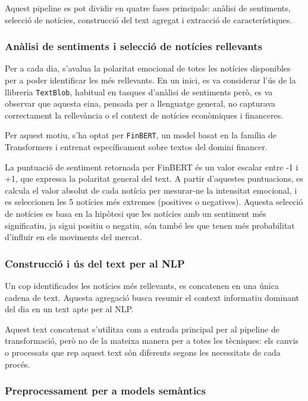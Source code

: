 \documentclass[12pt,a4paper,twoside]{book}
\begin{document}
Aquest pipeline es pot dividir en quatre fases principals: anàlisi de sentiments, selecció de notícies, construcció del text agregat i extracció de característiques.

\subsubsection{Anàlisi de sentiments i selecció de notícies rellevants}

Per a cada dia, s'avalua la polaritat emocional de totes les notícies disponibles per a poder identificar les més rellevants. En un inici, es va considerar l'ús de la llibreria \texttt{TextBlob}, habitual en tasques d'anàlisi de sentiments però, es va observar que aquesta eina, pensada per a llenguatge general, no capturava correctament la rellevància o el context de notícies econòmiques i financeres.

Per aquest motiu, s'ha optat per \texttt{FinBERT}, un model basat en la família de Transformers i entrenat específicament sobre textos del domini financer.

La puntuació de sentiment retornada per FinBERT és un valor escalar entre -1 i +1, que expressa la polaritat general del text. A partir d'aquestes puntuacions, es calcula el valor absolut de cada notícia per mesurar-ne la intensitat emocional, i es seleccionen les 5 notícies més extremes (positives o negatives). Aquesta selecció de notícies es basa en la hipòtesi que les notícies amb un sentiment més significatiu, ja sigui positiu o negatiu, són també les que tenen més probabilitat d'influir en els moviments del mercat.


\subsubsection{Construcció i ús del text per al NLP}

Un cop identificades les notícies més rellevants, es concatenen en una única cadena de text. Aquesta agregació busca resumir el context informatiu dominant del dia en un text apte per al NLP.

Aquest text concatenat s'utilitza com a entrada principal per al pipeline de transformació, però no de la mateixa manera per a totes les tècniques: els canvis o processats que rep aquest text són diferents segons les necessitats de cada procés.

\subsubsection{Preprocessament per a models semàntics}
\end{document}
